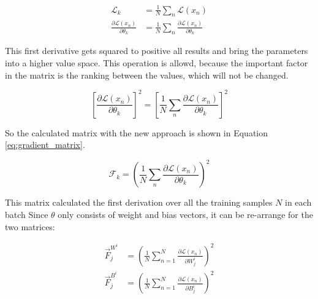 \begin{equation}
    \begin{split}
        \mathcal{L}_k & = 
        \frac{1}{N}
        \sum_{n} 
            \mathcal{L}(x_n)
        \\
        \frac{\partial \mathcal{L}(x_n)}{\partial \theta_k} & = 
        \frac{1}{N}
        \sum_{n} 
            \frac{\partial \mathcal{L}(x_n)}{\partial \theta_k}
    \end{split}
\end{equation}

This first derivative gets squared to positive all results and bring the parameters into a higher value space.
This operation is allowd, because the important factor in the matrix is the ranking between the values, which will not be changed.

\begin{equation}
    \left[
        \frac{\partial \mathcal{L}(x_n)}{\partial \theta_k}
        \right]^2
    = 
    \left[
        \frac{1}{N}
        \sum_{n} 
            \frac{\partial \mathcal{L}(x_n)}{\partial \theta_k}
        \right]^2
\end{equation}

So the calculated matrix with the new approach is shown in Equation \eqref{eq:gradient_matrix}.

\begin{equation}
    \mathcal{F}_k =
    \left(
        \frac{1}{N}
        \sum_{n} 
            \frac{\partial \mathcal{L}(x_n)}{\partial \theta_k}
        \right)^2
    \label{eq:gradient_matrix}
\end{equation}

This matrix calculated the first derivation over all the training samples $N$ in each batch
Since $\theta$ only consists of weight and bias vectors, it can be re-arrange for the two matrices:

\begin{equation}
    \begin{split}
        \vec{F}^{W^i}_j & = 
        \left(
            \frac{1}{N} 
            \sum_{n=1}^{N}
            \frac{\partial \mathcal{L} \left( x_n \right) }{\partial W^i_{j}}
        \right)^2
        \\
        \vec{F}^{B^i}_j & = 
        \left(
            \frac{1}{N} 
            \sum_{n=1}^{N} 
            \frac{\partial \mathcal{L} \left( x_n \right) }{\partial B^i_{j}}
        \right)^2
    \end{split}
\end{equation}

